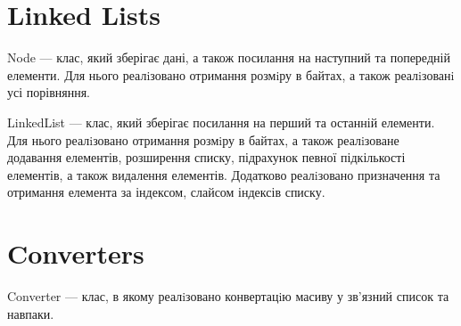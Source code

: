 \documentclass{article}
\begin{document}
    \section{Linked Lists}  

        \indent Node --- клас, який зберігає дані, а також посилання на наступний та попередній елементи.
        Для нього реалiзовано отримання розмiру в байтах, а також реалiзованi усі порівняння.

        LinkedList --- клас, який зберігає посилання на перший та останній елементи.
        Для нього реалiзовано отримання розмiру в байтах, а також реалiзоване
        додавання елементів, розширення списку, підрахунок певної підкількості елементів, а також видалення елементів.
        \newline
        \indent Додатково реалiзовано призначення та отримання елемента за індексом, слайсом індексів списку.
    \section{Converters}
    Converter --- клас, в якому реалiзовано конвертацiю масиву у зв’язний список та навпаки.
\end{document}
